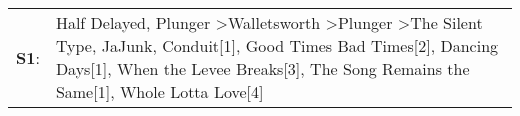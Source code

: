 \begin{supertabular}{p{0.03\textwidth}p{0.92\textwidth}}
 \textbf{S1}:  &  Half Delayed\textsuperscript{}, \enspace Plunger\textsuperscript{} \textgreater \enspace Walletsworth\textsuperscript{} \textgreater \enspace Plunger\textsuperscript{} \textgreater \enspace The Silent Type\textsuperscript{}, \enspace JaJunk\textsuperscript{}, \enspace Conduit[1]\textsuperscript{}, \enspace Good Times Bad Times[2]\textsuperscript{}, \enspace Dancing Days[1]\textsuperscript{}, \enspace When the Levee Breaks[3]\textsuperscript{}, \enspace The Song Remains the Same[1]\textsuperscript{}, \enspace Whole Lotta Love[4]\textsuperscript{}  \enspace  \\
\end{supertabular}
